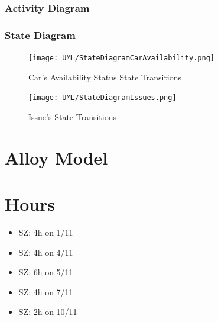 \documentclass[11pt]{article} %
\begin{document}
\subsubsection{Activity Diagram}
\subsubsection{State Diagram}
\begin{figure}[H]
	\centering
	\texttt{[image: UML/StateDiagramCarAvailability.png]}
	\caption{Car's Availability Status State Transitions}
\end{figure}
\begin{figure}[H]
	\centering
	\texttt{[image: UML/StateDiagramIssues.png]}
	\caption{Issue's State Transitions}
\end{figure}



\newpage
\section{Alloy Model}

\newpage
\section{Hours}

\begin{itemize}
	\item SZ: 4h on 1/11
	\item SZ: 4h on 4/11
	\item SZ: 6h on 5/11
	\item SZ: 4h on 7/11
	\item SZ: 2h on 10/11
\end{itemize}
\end{document}
